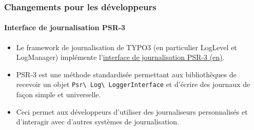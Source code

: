 \begin{frame}[fragile]
	\frametitle{Changements pour les développeurs}
	\framesubtitle{Interface de journalisation PSR-3}

	\begin{itemize}
		\item Le framework de journalisation de TYPO3 (en particulier LogLevel et LogManager)
			implémente l'\href{https://www.php-fig.org/psr/psr-3/}{interface de journalisation PSR-3 (en)}.

		\item PSR-3 est une méthode standardisée permettant aux bibliothèques de recevoir un objet
			\texttt{Psr\textbackslash
				Log\textbackslash
				LoggerInterface} et d'écrire des journaux de façon simple et universelle.

			\item Ceci permet aux développeurs d'utiliser des journaliseurs personnalisés et d'interagir
				avec d'autres systèmes de journalisation.

	\end{itemize}

\end{frame}


